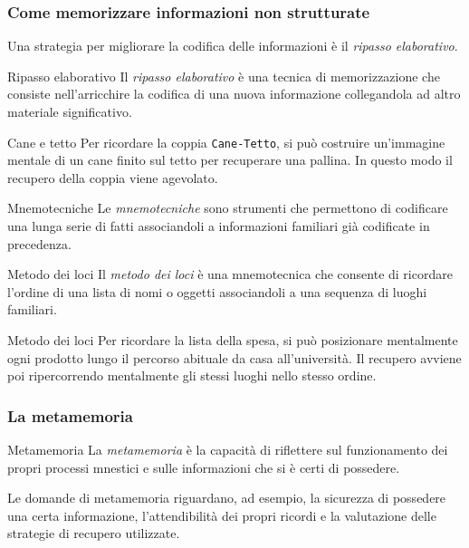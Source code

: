 \documentclass[a4paper]{article}
\begin{document}
\subsubsection{Come memorizzare informazioni non strutturate}
Una strategia per migliorare la codifica delle informazioni è il \emph{ripasso elaborativo}.
\begin{snippetdefinition}{Ripasso elaborativo}
    Il \emph{ripasso elaborativo} è una tecnica di memorizzazione che consiste nell'arricchire la codifica di una nuova informazione collegandola ad altro materiale significativo.
\end{snippetdefinition}
\begin{snippetexample}{Cane e tetto}
    Per ricordare la coppia \texttt{Cane-Tetto}, si può costruire un'immagine mentale di un cane finito sul tetto per recuperare una pallina. In questo modo il recupero della coppia viene agevolato.
\end{snippetexample}
\begin{snippetdefinition}{Mnemotecniche}
    Le \emph{mnemotecniche} sono strumenti che permettono di codificare una lunga serie di fatti associandoli a informazioni familiari già codificate in precedenza.
\end{snippetdefinition}
\begin{snippetdefinition}{Metodo dei loci}
    Il \emph{metodo dei loci} è una mnemotecnica che consente di ricordare l'ordine di una lista di nomi o oggetti associandoli a una sequenza di luoghi familiari.
\end{snippetdefinition}
\begin{snippetexample}{Metodo dei loci}
    Per ricordare la lista della spesa, si può posizionare mentalmente ogni prodotto lungo il percorso abituale da casa all'università. Il recupero avviene poi ripercorrendo mentalmente gli stessi luoghi nello stesso ordine.
\end{snippetexample}
\subsubsection{La metamemoria}
\begin{snippetdefinition}{Metamemoria}
    La \emph{metamemoria} è la capacità di riflettere sul funzionamento dei propri processi mnestici e sulle informazioni che si è certi di possedere.
\end{snippetdefinition}
Le domande di metamemoria riguardano, ad esempio, la sicurezza di possedere una certa informazione, l'attendibilità dei propri ricordi e la valutazione delle strategie di recupero utilizzate.
\end{document}
